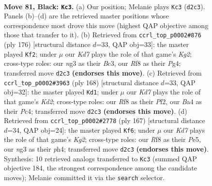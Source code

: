 \documentclass[11pt]{article}
\begin{document}
\clearpage

\begin{figure}[p]\centering
\begin{subfigure}{0.46\textwidth}\centering
\resizebox{\linewidth}{!}{%
\newchessgame
\chessboard[
  setfen={5r2/5p2/n5p1/3BP2p/b4Pp1/6N1/3k3P/6K1 b - - 21 81},
  showmover=false,
  pgfstyle=straightmove, color=movearrow, markmove={d2-c3}
]}
\caption{}
\end{subfigure}\hfill
\begin{subfigure}{0.46\textwidth}\centering
\resizebox{\linewidth}{!}{%
\newchessgame
\chessboard[
  setfen={8/1p6/5pk1/6p1/4P1P1/2B2P2/1P4K1/3b4 w - - 40 89},
  showmover=false,
  pgfstyle=straightmove, color=movearrow, markmove={g2-f2}
]}
\caption{}
\end{subfigure}
\\[4pt]
\begin{subfigure}{0.46\textwidth}\centering
\resizebox{\linewidth}{!}{%
\newchessgame
\chessboard[
  setfen={B7/8/5k2/p1b2p2/P1P1p1p1/4P1P1/3K1P2/8 w - - 40 85},
  showmover=false,
  pgfstyle=straightmove, color=movearrow, markmove={d2-d1}
]}
\caption{}
\end{subfigure}\hfill
\begin{subfigure}{0.46\textwidth}\centering
\resizebox{\linewidth}{!}{%
\newchessgame
\chessboard[
  setfen={8/6k1/6p1/2p1pp1p/2P1p2P/6P1/2B2K2/8 b - - 51 84},
  showmover=false,
  pgfstyle=straightmove, color=movearrow, markmove={g7-f6}
]}
\caption{}
\end{subfigure}
\caption{\textbf{Move 81, Black: \texttt{Kc3}.} (a) Our position; Melanie plays \texttt{Kc3} (\texttt{d2c3}). Panels (b)--(d) are the retrieved master positions whose correspondence most drove this move (highest QAP objective among those that transfer to it). (b) Retrieved from \texttt{ccrl\_top\_p0002\#876} (ply 176) [structural distance $d$=33, QAP obj=33]: the master played \texttt{Kf2}; under $\mu$ our \emph{Kd7} plays the role of that game's \emph{Kg2}; cross-type roles: our \emph{n}g3 as their \emph{B}c3, our \emph{R}f8 as their \emph{P}g4; transferred move \texttt{d2c3} \textbf{(endorses this move)}. (c) Retrieved from \texttt{ccrl\_top\_p0002\#3963} (ply 168) [structural distance $d$=33, QAP obj=32]: the master played \texttt{Kd1}; under $\mu$ our \emph{Kd7} plays the role of that game's \emph{Kd2}; cross-type roles: our \emph{R}f8 as their \emph{P}f2, our \emph{B}a4 as their \emph{P}c4; transferred move \texttt{d2c3} \textbf{(endorses this move)}. (d) Retrieved from \texttt{ccrl\_top\_p0002\#2778} (ply 167) [structural distance $d$=34, QAP obj=24]: the master played \texttt{Kf6}; under $\mu$ our \emph{Kd7} plays the role of that game's \emph{Kg2}; cross-type roles: our \emph{R}f8 as their \emph{P}e5, our \emph{n}g3 as their \emph{p}h4; transferred move \texttt{d2c3} \textbf{(endorses this move)}. Synthesis: 10 retrieved analogs transferred to \texttt{Kc3} (summed QAP objective 184, the strongest correspondence among the candidate moves); Melanie committed it via the \texttt{search} selector.}
\label{fig:thought-m161}
\end{figure}
\end{document}
